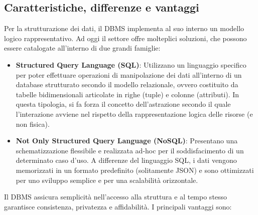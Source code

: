 \subsection{Caratteristiche, differenze e vantaggi}
Per la strutturazione dei dati, il DBMS implementa al suo interno un modello logico rappresentativo. Ad oggi il settore offre molteplici soluzioni, che possono essere catalogate all'interno di due grandi famiglie:
\begin{itemize}
    \item \textbf{Structured Query Language (SQL)}: Utilizzano un linguaggio specifico per poter effettuare operazioni di manipolazione dei dati all'interno di un database strutturato secondo il modello relazionale, ovvero costituito da tabelle bidimensionali articolate in righe (tuple) e colonne (attributi). In questa tipologia, si fa forza il concetto dell'astrazione secondo il quale l'interazione avviene nel rispetto della rappresentazione logica delle risorse (e non fisica).
    \item \textbf{Not Only Structured Query Language (NoSQL)}: Presentano una schematizzazione flessibile e realizzata ad-hoc per il soddisfacimento di un determinato caso d'uso. A differenze del linguaggio SQL, i dati vengono memorizzati in un formato predefinito (solitamente JSON) e sono ottimizzati per uno sviluppo semplice e per una scalabilità orizzontale.
\end{itemize}
Il DBMS assicura semplicità nell'accesso alla struttura e al tempo stesso garantisce consistenza, privatezza e affidabilità. I principali vantaggi sono:
